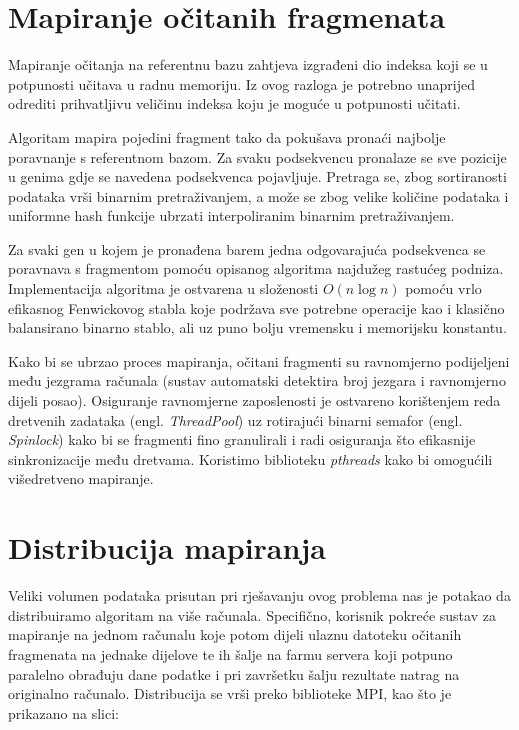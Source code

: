 \documentclass[times, utf8, diplomski]{fer}
\begin{document}
\section{Mapiranje očitanih fragmenata}

Mapiranje očitanja na referentnu bazu zahtjeva izgrađeni dio indeksa koji se u potpunosti učitava u radnu memoriju. Iz ovog razloga je potrebno unaprijed odrediti prihvatljivu veličinu indeksa koju je moguće u potpunosti učitati.

Algoritam mapira pojedini fragment tako da pokušava pronaći najbolje poravnanje s referentnom bazom. Za svaku
podsekvencu pronalaze se sve pozicije u genima gdje se navedena podsekvenca pojavljuje. Pretraga se, zbog
sortiranosti podataka vrši binarnim pretraživanjem, a može se zbog velike količine podataka i uniformne hash
funkcije ubrzati interpoliranim binarnim pretraživanjem. \cite{weiss1998data}

Za svaki gen u kojem je pronađena barem jedna odgovarajuća podsekvenca se poravnava s fragmentom pomoću opisanog
algoritma najdužeg rastućeg podniza. Implementacija algoritma je ostvarena u složenosti $O(n \log n)$ pomoću
vrlo efikasnog Fenwickovog stabla koje podržava sve potrebne operacije kao i klasično balansirano binarno stablo,
ali uz puno bolju vremensku i memorijsku konstantu. \cite{fenwick1994new}

Kako bi se ubrzao proces mapiranja, očitani fragmenti su ravnomjerno podijeljeni među jezgrama računala (sustav
automatski detektira broj jezgara i ravnomjerno dijeli posao). Osiguranje ravnomjerne zaposlenosti je ostvareno
korištenjem reda dretvenih zadataka (engl. \emph{ThreadPool}) uz rotirajući binarni semafor (engl. \emph{Spinlock})
kako bi se fragmenti fino granulirali i radi osiguranja što efikasnije sinkronizacije među dretvama. Koristimo
biblioteku \emph{pthreads} kako bi omogućili višedretveno mapiranje.

\section{Distribucija mapiranja}
Veliki volumen podataka prisutan pri rješavanju ovog problema nas je potakao da distribuiramo algoritam na
više računala. Specifično, korisnik pokreće sustav za mapiranje na jednom računalu koje potom dijeli ulaznu 
datoteku očitanih fragmenata na jednake dijelove te ih šalje na farmu servera koji potpuno paralelno obrađuju
dane podatke i pri završetku šalju rezultate natrag na originalno računalo. Distribucija se vrši preko biblioteke
MPI, kao što je prikazano na slici:
\end{document}
